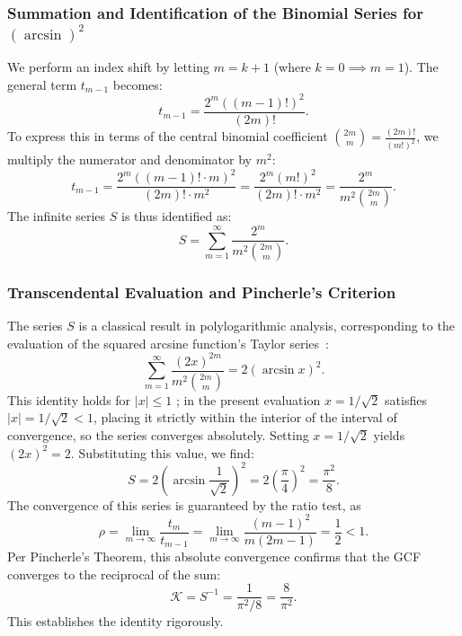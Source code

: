 \documentclass[pdflatex,sn-mathphys-num]{sn-jnl}
\theoremstyle{thmstyleone}
\theoremstyle{thmstyletwo}
\theoremstyle{thmstylethree}
\begin{document}
	\subsubsection{Summation and Identification of the Binomial Series for $(\arcsin)^2$}
	We perform an index shift by letting $m = k+1$ (where $k=0 \implies m=1$). The general term $t_{m-1}$ becomes:
	\begin{equation}
		t_{m-1} = \frac{2^m ((m-1)!)^2}{(2m)!}.
	\end{equation}
	To express this in terms of the central binomial coefficient $\binom{2m}{m} = \frac{(2m)!}{(m!)^2}$, we multiply the numerator and denominator by $m^2$:
	\begin{equation}
		t_{m-1} = \frac{2^m ((m-1)! \cdot m)^2}{(2m)! \cdot m^2} = \frac{2^m (m!)^2}{(2m)! \cdot m^2} = \frac{2^m}{m^2 \binom{2m}{m}}.
	\end{equation}
	The infinite series $S$ is thus identified as:
	\begin{equation}
		S = \sum_{m=1}^{\infty} \frac{2^m}{m^2 \binom{2m}{m}}.
	\end{equation}
	
	\subsubsection{Transcendental Evaluation and Pincherle's Criterion}
	The series $S$ is a classical result in polylogarithmic analysis, corresponding to the evaluation of the squared arcsine function's Taylor series~\cite{Lehmer1985}:
	\begin{equation}\label{eq:arcsin_series}
		\sum_{m=1}^{\infty} \frac{(2x)^{2m}}{m^2 \binom{2m}{m}} = 2(\arcsin x)^2.
	\end{equation}
	This identity holds for $|x| \le 1$ \cite{Lehmer1985}; in the present evaluation $x = 1/\sqrt{2}$ satisfies $|x| = 1/\sqrt{2} < 1$, placing it strictly within the interior of the interval of convergence, so the series converges absolutely.
	Setting $x = 1/\sqrt{2}$ yields $(2x)^2 = 2$. Substituting this value, we find:
	\begin{equation}
		S = 2 \left( \arcsin \frac{1}{\sqrt{2}} \right)^2 = 2 \left( \frac{\pi}{4} \right)^2 = \frac{\pi^2}{8}.
	\end{equation}
	The convergence of this series is guaranteed by the ratio test, as
	\begin{equation}
		\rho = \lim_{m \to \infty} \frac{t_m}{t_{m-1}} = \lim_{m\to\infty}\frac{(m-1)^2}{m(2m-1)} = \frac{1}{2} < 1.
	\end{equation}
	Per Pincherle's Theorem, this absolute convergence confirms that the GCF converges to the reciprocal of the sum:
	\begin{equation}
		\mathcal{K} = S^{-1} = \frac{1}{\pi^2/8} = \frac{8}{\pi^2}.
	\end{equation}
	This establishes the identity rigorously.
	
\end{document}
